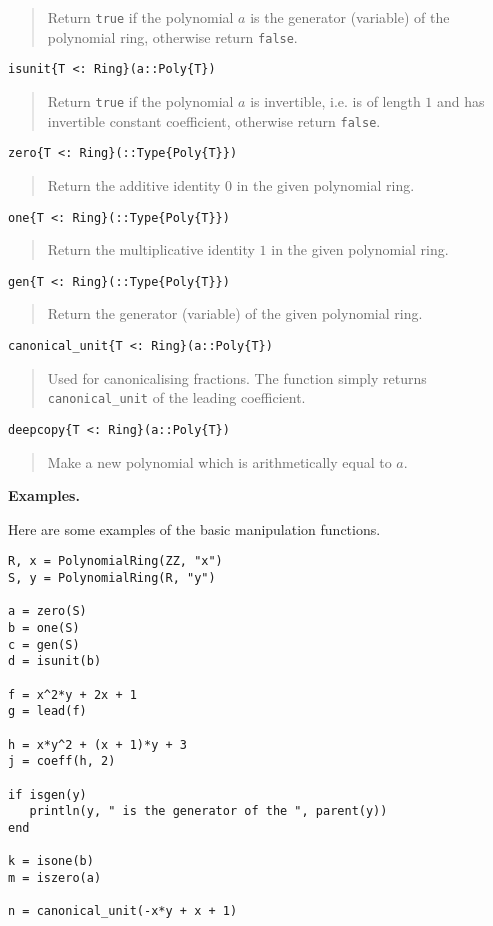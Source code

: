 \documentclass[a4paper,10pt]{article}
\newcommand{\code}{\lstinline}
\newcommand{\desc}[1]{\vspace{-3mm}\begin{quote}#1\end{quote}}
\begin{document}
\desc{Return \code{true} if the polynomial $a$ is the generator (variable) of the
polynomial ring, otherwise return \code{false}.}

\begin{lstlisting}
isunit{T <: Ring}(a::Poly{T})
\end{lstlisting}

\desc{Return \code{true} if the polynomial $a$ is invertible, i.e. is of length
$1$ and has invertible constant coefficient, otherwise return \code{false}.}

\begin{lstlisting}
zero{T <: Ring}(::Type{Poly{T}})
\end{lstlisting}

\desc{Return the additive identity $0$ in the given polynomial ring.}

\begin{lstlisting}
one{T <: Ring}(::Type{Poly{T}})
\end{lstlisting}

\desc{Return the multiplicative identity $1$ in the given polynomial ring.}

\begin{lstlisting}
gen{T <: Ring}(::Type{Poly{T}})
\end{lstlisting}

\desc{Return the generator (variable) of the given polynomial ring.}

\begin{lstlisting}
canonical_unit{T <: Ring}(a::Poly{T})
\end{lstlisting}

\desc{Used for canonicalising fractions. The function simply returns
\code{canonical_unit} of the leading coefficient.}

\begin{lstlisting}
deepcopy{T <: Ring}(a::Poly{T})
\end{lstlisting}

\desc{Make a new polynomial which is arithmetically equal to $a$.}

\textbf{Examples.}

Here are some examples of the basic manipulation functions.

\begin{lstlisting}
R, x = PolynomialRing(ZZ, "x")
S, y = PolynomialRing(R, "y")

a = zero(S)
b = one(S)
c = gen(S)
d = isunit(b)

f = x^2*y + 2x + 1
g = lead(f)

h = x*y^2 + (x + 1)*y + 3
j = coeff(h, 2)

if isgen(y)
   println(y, " is the generator of the ", parent(y))
end

k = isone(b)
m = iszero(a)

n = canonical_unit(-x*y + x + 1)
\end{lstlisting}
\end{document}
